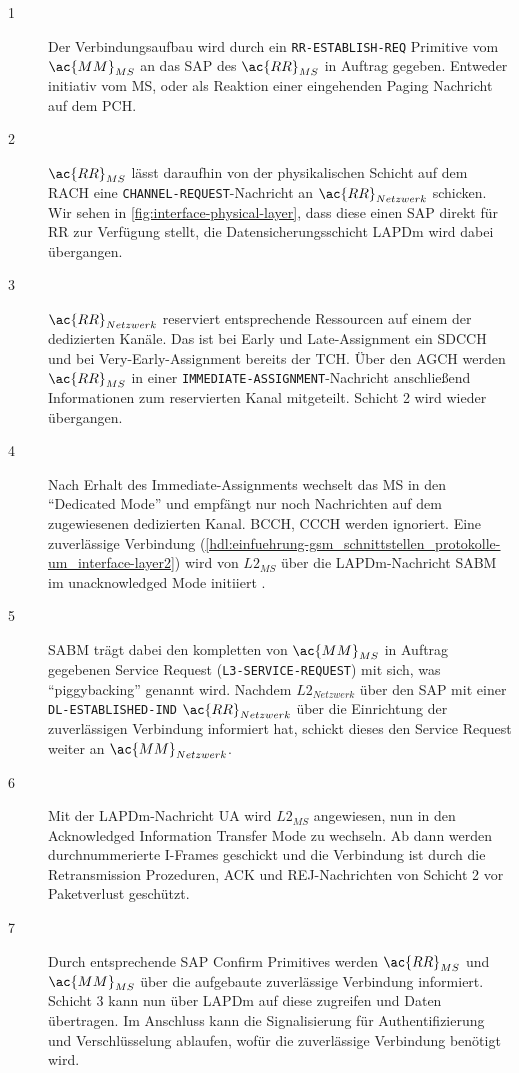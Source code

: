 \begin{description}
\item[1] Der Verbindungsaufbau wird durch ein \texttt{RR-ESTABLISH-REQ} Primitive vom $\ac{MM}_{MS}$ an das \ac{SAP} des $\ac{RR}_{MS}$ in Auftrag gegeben. Entweder initiativ vom \ac{MS}, oder als Reaktion einer eingehenden Paging Nachricht auf dem \ac{PCH}.
\item[2] $\ac{RR}_{MS}$ lässt daraufhin von der physikalischen Schicht auf dem \ac{RACH} eine \texttt{CHANNEL-REQUEST}-Nachricht an $\ac{RR}_{Netzwerk}$ schicken. Wir sehen in \autoref{fig:interface-physical-layer}, dass diese einen \ac{SAP} direkt für \ac{RR} zur Verfügung stellt, die Datensicherungsschicht \ac{LAPDm} wird dabei übergangen.
\item[3] $\ac{RR}_{Netzwerk}$ reserviert entsprechende Ressourcen auf einem der dedizierten Kanäle. Das ist bei Early und Late-Assignment ein \ac{SDCCH} und bei Very-Early-Assignment bereits der \ac{TCH}. Über den \ac{AGCH} werden $\ac{RR}_{MS}$ in einer \texttt{IMMEDIATE-ASSIGNMENT}-Nachricht anschließend Informationen zum reservierten Kanal mitgeteilt. Schicht 2 wird wieder übergangen.
\item[4] Nach Erhalt des Immediate-Assignments wechselt das \ac{MS} in den "`Dedicated Mode"' und empfängt nur noch Nachrichten auf dem zugewiesenen dedizierten Kanal. \ac{BCCH}, \ac{CCCH} werden ignoriert. Eine zuverlässige Verbindung (\autoref{hdl:einfuehrung-gsm_schnittstellen_protokolle-um_interface-layer2}) wird von $L2_{MS}$ über die \ac{LAPDm}-Nachricht \ac{SABM} im unacknowledged Mode initiiert .
\item[5] \ac{SABM} trägt dabei den kompletten von $\ac{MM}_{MS}$ in Auftrag gegebenen Service Request (\texttt{L3-SERVICE-REQUEST}) mit sich, was "`piggybacking"' genannt wird. Nachdem $L2_{Netzwerk}$ über den \ac{SAP} mit einer \texttt{DL-ESTABLISHED-IND} $\ac{RR}_{Netzwerk}$ über die Einrichtung der zuverlässigen Verbindung informiert hat, schickt dieses den Service Request weiter an $\ac{MM}_{Netzwerk}$. 
\item[6] Mit der \ac{LAPDm}-Nachricht \ac{UA} wird $L2_{MS}$ angewiesen, nun in den Acknowledged Information Transfer Mode zu wechseln. Ab dann werden durchnummerierte \ac{I}-Frames geschickt und die Verbindung ist durch die Retransmission Prozeduren, \ac{ACK} und \ac{REJ}-Nachrichten von Schicht 2 vor Paketverlust geschützt.
\item[7] Durch entsprechende \ac{SAP} Confirm Primitives werden $\ac{RR}_{MS}$ und $\ac{MM}_{MS}$ über die aufgebaute zuverlässige Verbindung informiert. Schicht 3 kann nun über \ac{LAPDm} auf diese zugreifen und Daten übertragen. Im Anschluss kann die Signalisierung für Authentifizierung und Verschlüsselung ablaufen, wofür die zuverlässige Verbindung benötigt wird.  

\end{description}
